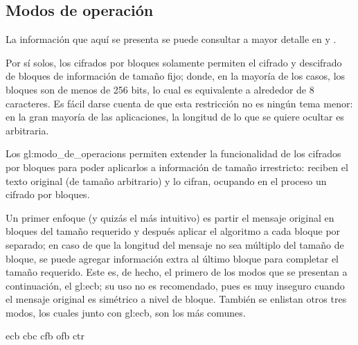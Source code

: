 %
%

\subsection{Modos de operación}
\label{sec:modos}

La información que aquí se presenta se puede consultar a mayor detalle en
\cite{modos_de_operacion} y \cite{menezes}.

Por sí solos, los cifrados por bloques solamente permiten el cifrado y
descifrado de bloques de información de tamaño fijo; donde, en la mayoría de
los casos, los bloques son de menos de 256 bits, lo cual es equivalente a
alrededor de 8 caracteres. Es fácil darse cuenta de que esta restricción no es
ningún tema menor: en la gran mayoría de las aplicaciones, la longitud de lo
que se quiere ocultar es arbitraria.

Los \glspl{gl:modo_de_operacion} permiten extender la funcionalidad de los
cifrados por bloques para poder aplicarlos a información de tamaño irrestricto:
reciben el texto original (de tamaño arbitrario) y lo cifran, ocupando en el
proceso un cifrado por bloques.

Un primer enfoque (y quizás el más intuitivo) es partir el mensaje original
en bloques del tamaño requerido y después aplicar el algoritmo a cada bloque
por separado; en caso de que la longitud del mensaje no sea múltiplo del
tamaño de bloque, se puede agregar información extra al último bloque para
completar el tamaño requerido. Este es, de hecho, el primero de los modos que
se presentan a continuación, el \gls{gl:ecb}; su uso no es
recomendado, pues es muy inseguro cuando el mensaje original es simétrico a
nivel de bloque. También se enlistan otros tres modos, los cuales junto con
\gls{gl:ecb}, son los más comunes.


{ecb}
{cbc}
{cfb}
{ofb}
{ctr}
